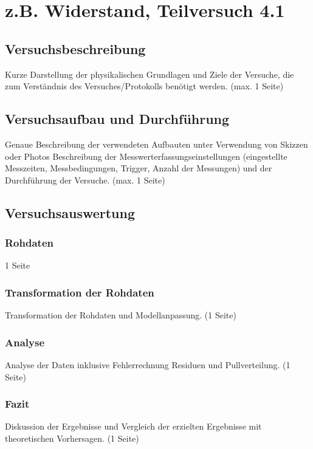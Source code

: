\documentclass[12pt,a4paper]{article}
\author{Gruppe C14 \\ Julián Häck, Martin Koytek, Lars Wenning, Erik Zimmermann}
\begin{document}
\section{z.B. Widerstand, Teilversuch 4.1}
\subsection{Versuchsbeschreibung}
Kurze Darstellung der physikalischen Grundlagen und Ziele der Versuche, die zum Verständnis
des Versuches/Protokolls benötigt werden. (max. 1 Seite)
\subsection{Versuchsaufbau und Durchführung}
Genaue Beschreibung der verwendeten Aufbauten unter Verwendung von Skizzen oder Photos
Beschreibung der Messwerterfassungseinstellungen (eingestellte Messzeiten, Messbedingungen,
Trigger, Anzahl der Messungen) und der Durchführung der Versuche. (max. 1 Seite)
\subsection{Versuchsauswertung}

\subsubsection{Rohdaten}
1 Seite
\subsubsection{Transformation der Rohdaten}
Transformation der Rohdaten und Modellanpassung. (1 Seite)
\subsubsection{Analyse}
Analyse der Daten inklusive Fehlerrechnung Residuen und Pullverteilung. (1 Seite)
\subsubsection{Fazit}
Diskussion der Ergebnisse und Vergleich der erzielten Ergebnisse mit theoretischen Vorhersagen.
(1 Seite)
\end{document}
